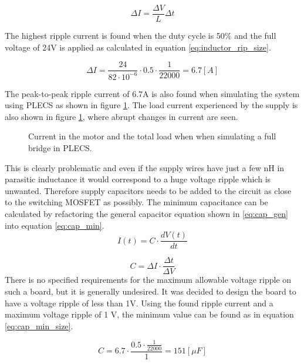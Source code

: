 \begin{equation}
	\Delta I = \frac{\Delta V}{L} \Delta t
	\label{eq:inductor_rip}
\end{equation}

The highest ripple current is found when the duty cycle is 50$\%$ and the full voltage of 24V is applied as calculated in equation \ref{eq:inductor_rip_size}.

\begin{equation}
	\Delta I = \frac{24}{82\cdot 10^{-6}} \cdot 0.5 \cdot \frac{1}{22000} = 6.7 [A] 
	\label{eq:inductor_rip_size}
\end{equation}

The peak-to-peak ripple current of $6.7$A is also found when simulating the system using PLECS as shown in figure \ref{fig:sim_currents}.
The load current experienced by the supply is also shown in figure \ref{fig:sim_currents}, where abrupt changes in current are seen. 

\begin{figure}[h]
	\centering
	\caption{Current in the motor and the total load when when simulating a full bridge in PLECS.}
	\label{fig:sim_currents}
\end{figure}

This is clearly problematic and even if the supply wires have just a few nH in parasitic inductance it would correspond to a huge voltage ripple which is unwanted. 
Therefore supply capacitors needs to be added to the circuit as close to the switching MOSFET as possibly.
The minimum capacitance can be calculated by refactoring the general capacitor equation shown in \ref{eq:cap_gen} into equation \ref{eq:cap_min}.
\begin{equation} 
	I(t) = C \cdot \frac{dV(t)}{dt}
	\label{eq:cap_gen}
\end{equation}

\begin{equation} 
	C = \Delta I \cdot \frac{\Delta t}{\Delta V}
	\label{eq:cap_min}
\end{equation}
There is no specified requirements for the maximum allowable voltage ripple on such a board, but it is generally undesired.
It was decided to design the board to have a voltage ripple of less than 1V.
Using the found ripple current and a maximum voltage ripple of 1 V, the minimum value can be found as in equation \ref{eq:cap_min_size}.

\begin{equation} 
	C = 6.7 \cdot \frac{0.5 \cdot \frac{1}{22000}}{1 } = 151 [\mu F]
	\label{eq:cap_min_size}
\end{equation}

